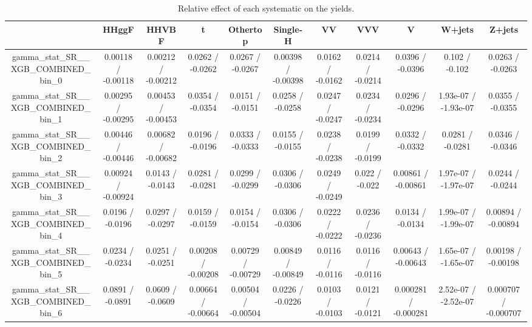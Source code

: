 \documentclass[10pt]{article}
\begin{document}
\begin{table}[htbp]
\begin{center}
\begin{tabular}{|c|c|c|c|c|c|c|c|c|c|c|}
\hline 
      & HHggF      & HHVBF      & t      & Othertop      & Single-H      & VV      & VVV      & V      & W+jets      & Z+jets \\ 
\hline 
  gamma_stat_SR__XGB_COMBINED_bin_0 & 0.00118 / -0.00118 & 0.00212 / -0.00212 & 0.0262 / -0.0262 & 0.0267 / -0.0267 & 0.00398 / -0.00398 & 0.0162 / -0.0162 & 0.0214 / -0.0214 & 0.0396 / -0.0396 & 0.102 / -0.102 & 0.0263 / -0.0263 \\ 
  gamma_stat_SR__XGB_COMBINED_bin_1 & 0.00295 / -0.00295 & 0.00453 / -0.00453 & 0.0354 / -0.0354 & 0.0151 / -0.0151 & 0.0258 / -0.0258 & 0.0247 / -0.0247 & 0.0234 / -0.0234 & 0.0296 / -0.0296 & 1.93e-07 / -1.93e-07 & 0.0355 / -0.0355 \\ 
  gamma_stat_SR__XGB_COMBINED_bin_2 & 0.00446 / -0.00446 & 0.00682 / -0.00682 & 0.0196 / -0.0196 & 0.0333 / -0.0333 & 0.0155 / -0.0155 & 0.0238 / -0.0238 & 0.0199 / -0.0199 & 0.0332 / -0.0332 & 0.0281 / -0.0281 & 0.0346 / -0.0346 \\ 
  gamma_stat_SR__XGB_COMBINED_bin_3 & 0.00924 / -0.00924 & 0.0143 / -0.0143 & 0.0281 / -0.0281 & 0.0299 / -0.0299 & 0.0306 / -0.0306 & 0.0249 / -0.0249 & 0.022 / -0.022 & 0.00861 / -0.00861 & 1.97e-07 / -1.97e-07 & 0.0244 / -0.0244 \\ 
  gamma_stat_SR__XGB_COMBINED_bin_4 & 0.0196 / -0.0196 & 0.0297 / -0.0297 & 0.0159 / -0.0159 & 0.0154 / -0.0154 & 0.0306 / -0.0306 & 0.0222 / -0.0222 & 0.0236 / -0.0236 & 0.0134 / -0.0134 & 1.99e-07 / -1.99e-07 & 0.00894 / -0.00894 \\ 
  gamma_stat_SR__XGB_COMBINED_bin_5 & 0.0234 / -0.0234 & 0.0251 / -0.0251 & 0.00208 / -0.00208 & 0.00729 / -0.00729 & 0.00849 / -0.00849 & 0.0116 / -0.0116 & 0.0116 / -0.0116 & 0.00643 / -0.00643 & 1.65e-07 / -1.65e-07 & 0.00198 / -0.00198 \\ 
  gamma_stat_SR__XGB_COMBINED_bin_6 & 0.0891 / -0.0891 & 0.0609 / -0.0609 & 0.00664 / -0.00664 & 0.00504 / -0.00504 & 0.0226 / -0.0226 & 0.0103 / -0.0103 & 0.0121 / -0.0121 & 0.000281 / -0.000281 & 2.52e-07 / -2.52e-07 & 0.000707 / -0.000707 \\ 
\hline 
\end{tabular} 
\caption{Relative effect of each systematic on the yields.} 
\end{center} 
\end{table} 
\end{document}
